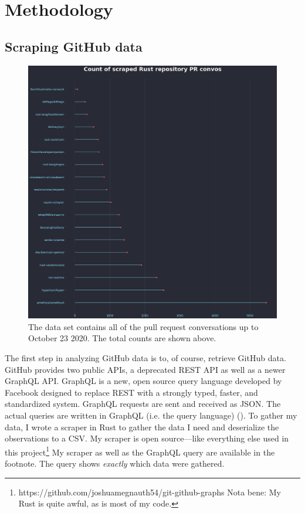 \documentclass[12pt, a4paper]{article}
\begin{document}
\section{Methodology}
\subsection{Scraping GitHub data}
\begin{figure}[ht!]
    \includegraphics[width=\linewidth]{lollypopcounts.png}
    \caption{The data set contains all of the pull request conversations up to October 23 2020. The total counts are shown above.}
    \label{fig:lollycounts}
\end{figure}

The first step in analyzing GitHub data is to, of course, retrieve GitHub data. GitHub provides two public APIs, a deprecated REST API as well as a newer GraphQL API. GraphQL is a new, open source query language developed by Facebook designed to replace REST with a strongly typed, faster, and standardized system. GraphQL requests are sent and received as JSON. The actual queries are written in GraphQL (i.e. the query language) (\cite{graphql}). To gather my data, I wrote a scraper in Rust to gather the data I need and deserialize the observations to a CSV. My scraper is open source---like everything else used in this project\footnote{https://github.com/joshuamegnauth54/git-github-graphs Nota bene: My Rust is quite awful, as is most of my code.} My scraper as well as the GraphQL query are available in the footnote. The query shows \textit{exactly} which data were gathered.
\end{document}
